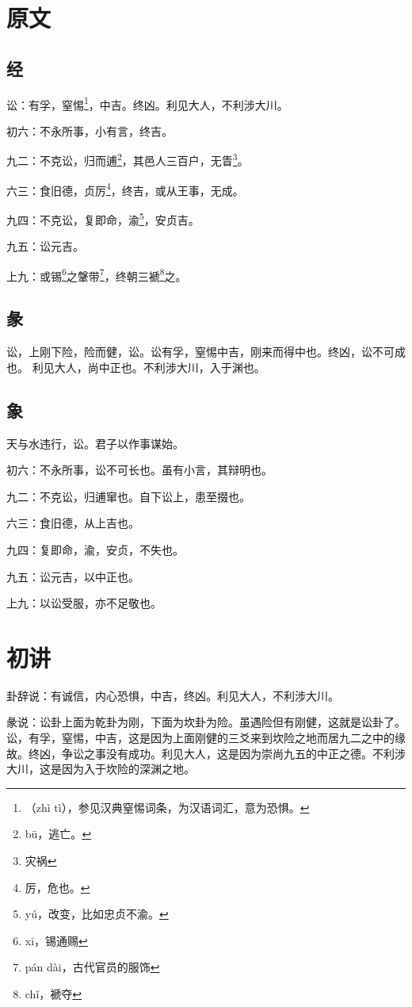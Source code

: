 \documentclass[12pt,oneside]{book}
\begin{document}
\section{原文}
\subsection{经}
讼：有孚，窒惕\footnote{（zhì tì），参见汉典窒惕词条，为汉语词汇，意为恐惧。}，中吉。终凶。利见大人，不利涉大川。

初六：不永所事，小有言，终吉。

九二：不克讼，归而逋\footnote{bū，逃亡。}，其邑人三百户，无眚\footnote{灾祸}。

六三：食旧德，贞厉\footnote{厉，危也。}，终吉，或从王事，无成。

九四：不克讼，复即命，渝\footnote{yú，改变，比如忠贞不渝。}，安贞吉。

九五：讼元吉。

上九：或锡\footnote{xī，锡通赐}之鞶带\footnote{pán dài，古代官员的服饰}，终朝三褫\footnote{chǐ，褫夺}之。

\subsection{彖}
讼，上刚下险，险而健，讼。讼有孚，窒惕中吉，刚来而得中也。终凶，讼不可成也。 利见大人，尚中正也。不利涉大川，入于渊也。

\subsection{象}
天与水违行，讼。君子以作事谋始。

初六：不永所事，讼不可长也。虽有小言，其辩明也。

九二：不克讼，归逋窜也。自下讼上，患至掇也。

六三：食旧德，从上吉也。

九四：复即命，渝，安贞，不失也。

九五：讼元吉，以中正也。

上九：以讼受服，亦不足敬也。


\section{初讲}
卦辞说：有诚信，内心恐惧，中吉，终凶。利见大人，不利涉大川。

彖说：讼卦上面为乾卦为刚，下面为坎卦为险。虽遇险但有刚健，这就是讼卦了。讼，有孚，窒惕，中吉，这是因为上面刚健的三爻来到坎险之地而居九二之中的缘故。终凶，争讼之事没有成功。利见大人，这是因为崇尚九五的中正之德。不利涉大川，这是因为入于坎险的深渊之地。
\end{document}
